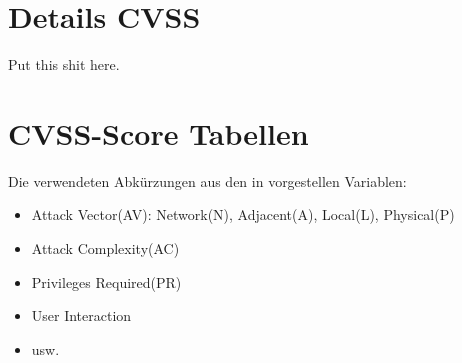 \section{Details CVSS}
    Put this shit here.
\newpage
\section{CVSS-Score Tabellen}
    Die verwendeten Abkürzungen aus den in  vorgestellen Variablen:
    \begin{itemize}[noitemsep]
        \item Attack Vector(AV): Network(N), Adjacent(A), Local(L), Physical(P)
        \item Attack Complexity(AC)
        \item Privileges Required(PR)
        \item User Interaction
        \item usw. 
    \end{itemize}

